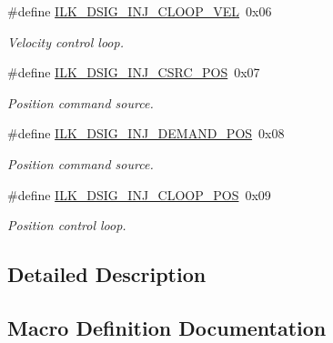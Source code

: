 \begin{DoxyCompactItemize}
\#define \hyperlink{group__IL__CONST__DSIG__INJ_gae687f53e49d8047df481297c1621eb6d}{I\+L\+K\+\_\+\+D\+S\+I\+G\+\_\+\+I\+N\+J\+\_\+\+C\+L\+O\+O\+P\+\_\+\+V\+EL}~0x06
\begin{DoxyCompactList}\small\item\em Velocity control loop. \end{DoxyCompactList}\item 
\#define \hyperlink{group__IL__CONST__DSIG__INJ_ga51800e271fa5f8d6fe7674956a827d04}{I\+L\+K\+\_\+\+D\+S\+I\+G\+\_\+\+I\+N\+J\+\_\+\+C\+S\+R\+C\+\_\+\+P\+OS}~0x07
\begin{DoxyCompactList}\small\item\em Position command source. \end{DoxyCompactList}\item 
\#define \hyperlink{group__IL__CONST__DSIG__INJ_gaf90006989892a45217b8254bdffd7e5b}{I\+L\+K\+\_\+\+D\+S\+I\+G\+\_\+\+I\+N\+J\+\_\+\+D\+E\+M\+A\+N\+D\+\_\+\+P\+OS}~0x08
\begin{DoxyCompactList}\small\item\em Position command source. \end{DoxyCompactList}\item 
\#define \hyperlink{group__IL__CONST__DSIG__INJ_ga108671d95dfe95f35d1e1d80e6aac8a8}{I\+L\+K\+\_\+\+D\+S\+I\+G\+\_\+\+I\+N\+J\+\_\+\+C\+L\+O\+O\+P\+\_\+\+P\+OS}~0x09
\begin{DoxyCompactList}\small\item\em Position control loop. \end{DoxyCompactList}\end{DoxyCompactItemize}


\subsection{Detailed Description}


\subsection{Macro Definition Documentation}
